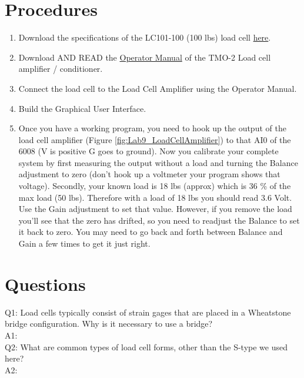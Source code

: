 \documentclass[12pt,letterpaper]{article}
\begin{document}
\section{Procedures}	 
\begin{enumerate}
\item Download the specifications of the LC101-100 (100 lbs) load cell \href{http://abe-research.illinois.edu/Faculty/grift/ABE425_2015/Specs/LC101.pdf}{here}. 
\item Download AND READ the \href{http://abe-research.illinois.edu/Faculty/grift/ABE425_2015/Specs/tmo2.pdf}{Operator Manual} of the TMO-2 Load cell amplifier / conditioner.
\item Connect the load cell to the Load Cell Amplifier using the Operator Manual. 
\item Build the Graphical User Interface.
\item Once you have a working program, you need to hook up the output of the load cell amplifier (Figure \ref{fig:Lab9_LoadCellAmplifier}) to that AI0 of the 6008 (V is positive G goes to ground). Now you calibrate your complete system by first measuring the output without a load and turning the Balance adjustment to zero (don't hook up a voltmeter your program shows that voltage). Secondly, your known load is 18 lbs (approx) which is 36 \% of the max load (50 lbs). Therefore with a load of 18 lbs you should read 3.6 Volt. Use the Gain adjustment to set that value. However, if you remove the load you'll see that the zero has drifted, so you need to readjust the Balance to set it back to zero. You may need to go back and forth between Balance and Gain a few times to get it just right.
\end{enumerate}


\section{Questions}

Q1:	Load cells typically consist of strain gages that are placed in a Wheatstone bridge configuration. Why is it necessary to use a bridge? \\
A1:\\

Q2:	What are common types of load cell forms, other than the S-type we used here?\\
A2:\\
\end{document}
